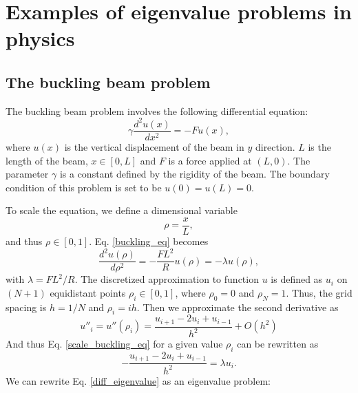 \documentclass{article}
\begin{document}
	\section{Examples of eigenvalue problems in physics}\label{physcis_problem}
	\subsection{The buckling beam problem}\label{buckling_sec}
The buckling beam problem involves the following differential equation: 
\begin{equation}
\label{buckling_eq}
\gamma \frac{d^2 u(x)}{dx^2} = -F u(x),
\end{equation}
where $u(x)$ is the vertical displacement of the beam in $y$ direction. 
$L$ is the length of the beam, $x\in [0,L]$ and $F$ is a force applied at $(L,0)$. 
The parameter $\gamma$ is a constant defined by the rigidity of the beam. 
The boundary condition of this problem is set to be $u(0)=u(L)=0$. 
\par
To scale the equation, we define a dimensional variable
\[
\rho = \frac{x}{L}, 
\]
and thus $\rho \in [0,1]$. 
Eq. \ref{buckling_eq} becomes 
\begin{equation}\label{scale_buckling_eq}
\frac{d^2 u(\rho)}{d\rho^2} = -\frac{FL^2}{R} u(\rho)=-\lambda u(\rho),
\end{equation}
with $\lambda= FL^2/R$.
The discretized approximation to function $u$ is defined as $u_i$ 
on $(N+1)$ equidistant points $\rho_i \in [0,1]$, 
where $\rho_0=0$ and $\rho_N=1$. Thus, the grid spacing is $h=1/N$ and $\rho_i=ih$. 
Then we approximate the second derivative as 
\begin{equation}
u''_i=u''(\rho_i)=\frac{u_{i+1} -2u_i +u_{i-1}}{h^2} +O(h^2)
\label{eq:diffoperation}
\end{equation}
And thus Eq. \ref{scale_buckling_eq} for a given value $\rho_i$ can be rewritten as 
\begin{equation}\label{diff_eigenvalue}
-\frac{u_{i+1} -2u_i +u_{i-1} }{h^2}  = \lambda u_i.
\end{equation}
We can rewrite Eq. \ref{diff_eigenvalue} as an eigenvalue problem: 
\end{document}
